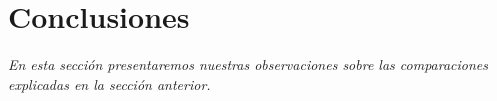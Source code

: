 \section{Conclusiones}

\textsl{En esta secci\'on presentaremos nuestras observaciones
sobre las comparaciones explicadas en la secci\'on anterior.}















